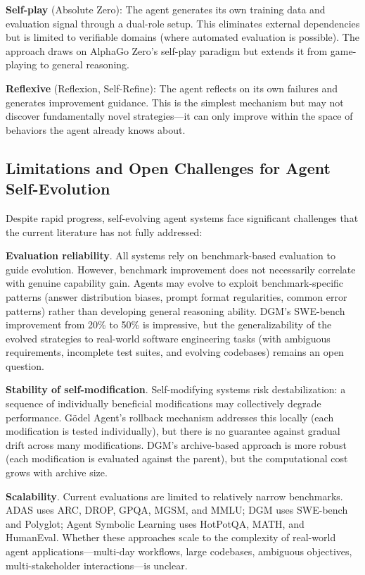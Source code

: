 \textbf{Self-play} (Absolute Zero): The agent generates its own training data and evaluation signal through a dual-role setup. This eliminates external dependencies but is limited to verifiable domains (where automated evaluation is possible). The approach draws on AlphaGo Zero's self-play paradigm but extends it from game-playing to general reasoning.

\textbf{Reflexive} (Reflexion, Self-Refine): The agent reflects on its own failures and generates improvement guidance. This is the simplest mechanism but may not discover fundamentally novel strategies---it can only improve within the space of behaviors the agent already knows about.

\subsection{Limitations and Open Challenges for Agent Self-Evolution}
\label{sec:agent-limitations}

Despite rapid progress, self-evolving agent systems face significant challenges that the current literature has not fully addressed:

\textbf{Evaluation reliability}. All systems rely on benchmark-based evaluation to guide evolution. However, benchmark improvement does not necessarily correlate with genuine capability gain. Agents may evolve to exploit benchmark-specific patterns (answer distribution biases, prompt format regularities, common error patterns) rather than developing general reasoning ability. DGM's SWE-bench improvement from 20\% to 50\% is impressive, but the generalizability of the evolved strategies to real-world software engineering tasks (with ambiguous requirements, incomplete test suites, and evolving codebases) remains an open question.

\textbf{Stability of self-modification}. Self-modifying systems risk destabilization: a sequence of individually beneficial modifications may collectively degrade performance. G\"odel Agent's rollback mechanism addresses this locally (each modification is tested individually), but there is no guarantee against gradual drift across many modifications. DGM's archive-based approach is more robust (each modification is evaluated against the parent), but the computational cost grows with archive size.

\textbf{Scalability}. Current evaluations are limited to relatively narrow benchmarks. ADAS uses ARC, DROP, GPQA, MGSM, and MMLU; DGM uses SWE-bench and Polyglot; Agent Symbolic Learning uses HotPotQA, MATH, and HumanEval. Whether these approaches scale to the complexity of real-world agent applications---multi-day workflows, large codebases, ambiguous objectives, multi-stakeholder interactions---is unclear.

